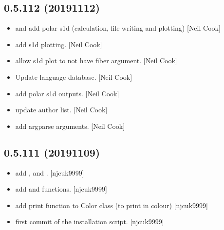 \documentclass[a4paper,10pt,english]{report}
\begin{document}
\subsection{0.5.112 (2019\sphinxhyphen{}11\sphinxhyphen{}12)}
\label{\detokenize{misc/changelog:id50}}\begin{itemize}
\item {} 
 and  \sphinxhyphen{} add
polar s1d (calculation, file writing and plotting) {[}Neil Cook{]}

\item {} 
 \sphinxhyphen{} add s1d plotting. {[}Neil Cook{]}

\item {} 
 \sphinxhyphen{} allow s1d plot to not have fiber
argument. {[}Neil Cook{]}

\item {} 
Update language database. {[}Neil Cook{]}

\item {} 
  \sphinxhyphen{}
add polar s1d outputs. {[}Neil Cook{]}

\item {} 
 \sphinxhyphen{} update author list. {[}Neil
Cook{]}

\item {} 
 \sphinxhyphen{} add argparse arguments. {[}Neil Cook{]}

\end{itemize}


\subsection{0.5.111 (2019\sphinxhyphen{}11\sphinxhyphen{}09)}
\label{\detokenize{misc/changelog:id51}}\begin{itemize}
\item {} 
 \sphinxhyphen{} add ,
 and . {[}njcuk9999{]}

\item {} 
 \sphinxhyphen{} add  and
 functions. {[}njcuk9999{]}

\item {} 
 \sphinxhyphen{} add print function to Color
class (to print in colour) {[}njcuk9999{]}

\item {} 
 \sphinxhyphen{} first commit of the
installation script. {[}njcuk9999{]}

\end{itemize}
\end{document}
